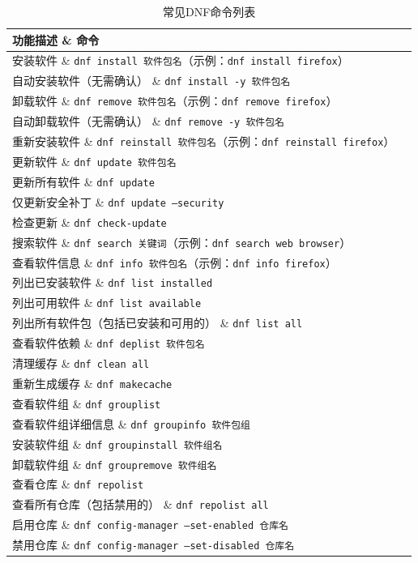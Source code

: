\documentclass[12pt,UTF8]{ctexbook}
\begin{document}
\begin{table}[htbp]
    \centering
    \begin{tabularx}{\textwidth}{|X|l|}
        \hline
        \textbf{功能描述} \& \textbf{命令} \\
        \hline
        安装软件 \& \texttt{dnf install 软件包名}（示例：\texttt{dnf install firefox}） \\
        自动安装软件（无需确认） \& \texttt{dnf install -y 软件包名} \\
        卸载软件 \& \texttt{dnf remove 软件包名}（示例：\texttt{dnf remove firefox}） \\
        自动卸载软件（无需确认） \& \texttt{dnf remove -y 软件包名} \\
        重新安装软件 \& \texttt{dnf reinstall 软件包名}（示例：\texttt{dnf reinstall firefox}） \\
        \hline
        更新软件 \& \texttt{dnf update 软件包名} \\
        更新所有软件 \& \texttt{dnf update} \\
        仅更新安全补丁 \& \texttt{dnf update --security} \\
        检查更新 \& \texttt{dnf check-update} \\
        \hline
        搜索软件 \& \texttt{dnf search 关键词}（示例：\texttt{dnf search web browser}） \\
        查看软件信息 \& \texttt{dnf info 软件包名}（示例：\texttt{dnf info firefox}） \\
        列出已安装软件 \& \texttt{dnf list installed} \\
        列出可用软件 \& \texttt{dnf list available} \\
        列出所有软件包（包括已安装和可用的） \& \texttt{dnf list all} \\
        查看软件依赖 \& \texttt{dnf deplist 软件包名} \\
        \hline
        清理缓存 \& \texttt{dnf clean all} \\
        重新生成缓存 \& \texttt{dnf makecache} \\
        \hline
        查看软件组 \& \texttt{dnf grouplist} \\
        查看软件组详细信息 \& \texttt{dnf groupinfo 软件包组} \\
        安装软件组 \& \texttt{dnf groupinstall 软件组名} \\
        卸载软件组 \& \texttt{dnf groupremove 软件组名} \\
        \hline
        查看仓库 \& \texttt{dnf repolist} \\
        查看所有仓库（包括禁用的） \& \texttt{dnf repolist all} \\
        启用仓库 \& \texttt{dnf config-manager --set-enabled 仓库名} \\
        禁用仓库 \& \texttt{dnf config-manager --set-disabled 仓库名} \\
        \hline
    \end{tabularx}
    \caption{常见DNF命令列表}
    \label{tab:dnf\_commands}
\end{table}
\end{document}
